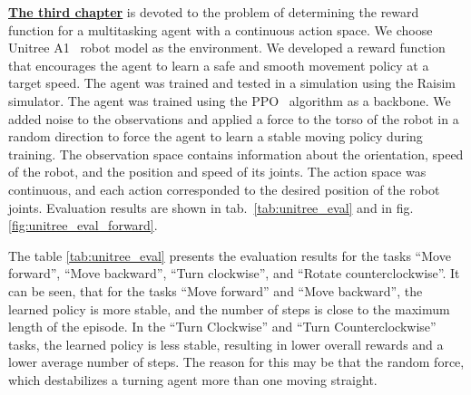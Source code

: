 \underline{\textbf{The third chapter}} is devoted to the problem of determining the reward function for a multitasking agent with a continuous action space. We choose Unitree A1~\cite{unitree} robot model as the environment. We developed a reward function that encourages the agent to learn a safe and smooth movement policy at a target speed. The agent was trained and tested in a simulation using the Raisim \cite{raisim} simulator. The agent was trained using the PPO~\cite{Schulman2017ProximalPO} algorithm as a backbone. We added noise to the observations and applied a force to the torso of the robot in a random direction to force the agent to learn a stable moving policy during training. The observation space contains information about the orientation, speed of the robot, and the position and speed of its joints. The action space was continuous, and each action corresponded to the desired position of the robot joints. Evaluation results are shown in tab.~\ref{tab:unitree_eval} and in fig.~ \ref{fig:unitree_eval_forward}. 

The table \ref{tab:unitree_eval} presents the evaluation results for the tasks ``Move forward'', ``Move backward'', ``Turn clockwise'', and ``Rotate counterclockwise''. It can be seen, that for the tasks ``Move forward'' and ``Move backward'', the learned policy is more stable, and the number of steps is close to the maximum length of the episode. In the ``Turn Clockwise'' and ``Turn Counterclockwise'' tasks, the learned policy is less stable, resulting in lower overall rewards and a lower average number of steps. The reason for this may be that the random force, which destabilizes a turning agent more than one moving straight.

